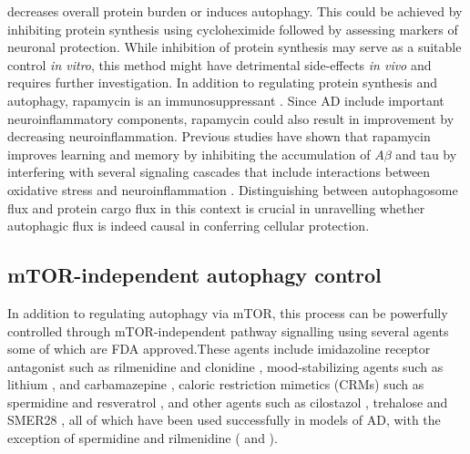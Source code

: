 decreases overall protein burden or induces autophagy. This could be achieved by inhibiting protein synthesis using cycloheximide \citep{Watanabe-Asano2014} followed by assessing markers of neuronal protection. While inhibition of protein synthesis may serve as a suitable control \textit{in vitro}, this method might have detrimental side-effects \textit{in vivo} and requires further investigation. In addition to regulating protein synthesis and autophagy, rapamycin is an immunosuppressant \citep{Khanna2000,Mohacsi1992,Wicker1990}. Since AD include important neuroinflammatory components, rapamycin could also result in improvement by decreasing neuroinflammation. Previous studies have shown that rapamycin improves learning and memory by inhibiting the accumulation of $A\beta$ and tau by interfering with several signaling cascades \citep{Liu2013,Liu2013a,Maiese2012} that include interactions between oxidative stress and neuroinflammation \citep{Agostinho2010,Galimberti2011}. Distinguishing between autophagosome flux and protein cargo flux in this context is crucial in unravelling whether autophagic flux is indeed causal in conferring cellular protection. 

\subsection{mTOR-independent autophagy control}
In addition to regulating autophagy via mTOR, this process can be powerfully controlled through mTOR-independent pathway signalling using several agents some of which are FDA approved.These agents include imidazoline receptor antagonist such as rilmenidine and clonidine \citep{Rose2010,Williams2008}, mood-stabilizing agents such as lithium \citep{Shimada2012,Zhang2011}, and carbamazepine \citep{Li2013,Zhang2017}, caloric restriction mimetics (CRMs) such as spermidine \citep{Buttner2014,Wang2012} and resveratrol \citep{Lee2015}, and other agents such as cilostazol \citep{Lee2015}, trehalose \citep{Rodriguez-Navarro2010,Schaeffer2012,Kruger2012} and SMER28 \citep{Tian2011}, all of which have been used successfully in models of AD, with the exception of spermidine and rilmenidine ( and ).

